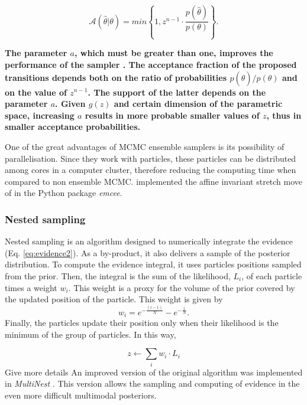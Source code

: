 \begin{equation}
\mathcal{A}(\hat{\theta}|\theta)=min\left\{1,z^{n-1}\cdot \frac{p(\hat{\theta})}{p(\theta)}\right\}.
\end{equation} 

\textbf{The parameter $a$, which must be greater than one, improves the performance of the sampler \citep{Goodman2010}. The acceptance fraction of the proposed transitions depends both on the ratio of probabilities $p(\hat{\theta})/p(\theta)$ and on the value of $z^{n-1}$. The support of the latter depends on the parameter $a$. Given $g(z)$ and certain dimension of the parametric space, increasing $a$ results in more probable smaller values of $z$, thus in smaller acceptance probabilities.}

One of the great advantages of MCMC ensemble samplers  is its possibility of parallelisation. Since they work with particles, these particles can be distributed among cores in a computer cluster, therefore reducing the computing time when compared to non ensemble MCMC. \citet{Foreman2013} implemented the affine invariant stretch move of \citet{Goodman2010} in the Python package \emph{emcee}. 
\subsubsection{Nested sampling}
\label{sect:NestedSampling}
Nested sampling \citep{Skilling2004,Skilling2006} is an algorithm designed to numerically integrate the evidence (Eq. \ref{eq:evidence2}). As a by-product, it also delivers a sample of the posterior distribution. To compute the evidence integral,  it uses particles positions sampled from the prior. Then, the integral is the sum of the likelihood, $L_i$, of each particle times a weight $w_i$. This weight is a proxy for the volume of the prior covered by the updated position of the particle. This weight is given by 
\begin{equation}
w_i = e^{-\frac{(i-1)}{N}} - e^{-\frac{i}{N}}.\nonumber 
\end{equation}
Finally, the particles update their position only when their likelihood is the minimum of the group of particles. In this way,

\begin{equation}
z \leftarrow \sum_i w_i\cdot L_i
\end{equation}
{\color{red}Give more details}
An improved version of the original algorithm was implemented in \emph{MultiNest} \citep{Feroz2009}. This version allows the sampling and computing of evidence in the even more difficult multimodal posteriors. 

